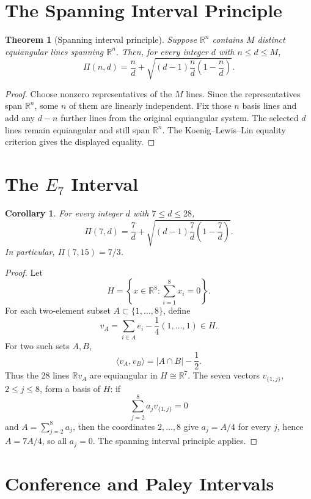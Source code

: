 \documentclass[11pt]{article}
\newtheorem{theorem}{Theorem}
\newtheorem{corollary}{Corollary}
\newcommand{\R}{\mathbb{R}}
\newcommand{\PiRel}{\Pi}
\begin{document}
\section*{The Spanning Interval Principle}

\begin{theorem}[Spanning interval principle]
Suppose \(\R^n\) contains \(M\) distinct equiangular lines spanning \(\R^n\).
Then, for every integer \(d\) with \(n\le d\le M\),
\[
  \PiRel(n,d)=
  \frac nd+\sqrt{(d-1)\frac nd\left(1-\frac nd\right)}.
\]
\end{theorem}

\begin{proof}
Choose nonzero representatives of the \(M\) lines.  Since the representatives
span \(\R^n\), some \(n\) of them are linearly independent.  Fix those \(n\)
basis lines and add any \(d-n\) further lines from the original equiangular
system.  The selected \(d\) lines remain equiangular and still span \(\R^n\).
The Koenig--Lewis--Lin equality criterion gives the displayed equality.
\end{proof}

\section*{The \(E_7\) Interval}

\begin{corollary}
For every integer \(d\) with \(7\le d\le28\),
\[
  \PiRel(7,d)=
  \frac7d+\sqrt{(d-1)\frac7d\left(1-\frac7d\right)}.
\]
In particular, \(\PiRel(7,15)=7/3\).
\end{corollary}

\begin{proof}
Let
\[
  H=\left\{x\in\R^8:\sum_{i=1}^8 x_i=0\right\}.
\]
For each two-element subset \(A\subset\{1,\ldots,8\}\), define
\[
  v_A=\sum_{i\in A}e_i-\frac14(1,\ldots,1)\in H.
\]
For two such sets \(A,B\),
\[
  \langle v_A,v_B\rangle=|A\cap B|-\frac12.
\]
Thus the 28 lines \(\R v_A\) are equiangular in \(H\cong\R^7\).  The seven
vectors \(v_{\{1,j\}}\), \(2\le j\le8\), form a basis of \(H\): if
\[
  \sum_{j=2}^8 a_jv_{\{1,j\}}=0
\]
and \(A=\sum_{j=2}^8a_j\), then the coordinates \(2,\ldots,8\) give
\(a_j=A/4\) for every \(j\), hence \(A=7A/4\), so all \(a_j=0\).
The spanning interval principle applies.
\end{proof}

\section*{Conference and Paley Intervals}
\end{document}
